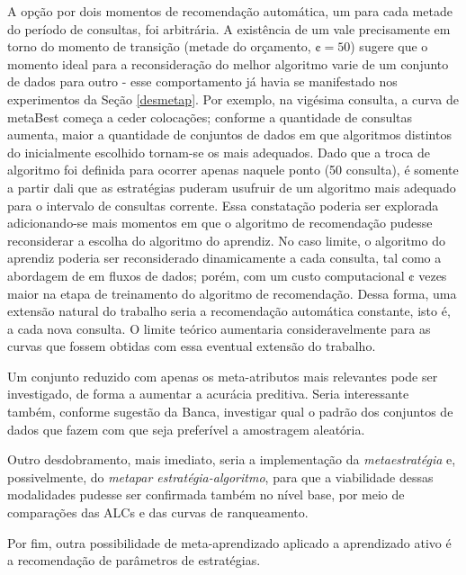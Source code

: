 A opção por dois momentos de recomendação automática, um para cada metade do período de consultas, foi arbitrária.
A existência de um vale precisamente em torno do momento de transição (metade do orçamento, $\cent=50$)
sugere que o momento ideal para a reconsideração do melhor algoritmo varie de um conjunto de dados para outro - esse comportamento já havia se manifestado nos experimentos da Seção \ref{desmetap}.
Por exemplo, na vigésima consulta, a curva de metaBest começa a ceder colocações; conforme a quantidade de consultas aumenta, maior a quantidade de conjuntos de dados em que algoritmos distintos do inicialmente escolhido tornam-se os mais adequados.
Dado que a troca de algoritmo foi definida para ocorrer apenas naquele ponto (50\textordfeminine\xspace consulta), é somente a partir dali que as estratégias puderam usufruir de um algoritmo mais adequado para o intervalo de consultas corrente.
Essa constatação poderia ser explorada adicionando-se mais momentos em que o algoritmo de recomendação pudesse reconsiderar a escolha do algoritmo do aprendiz.
No caso limite, o algoritmo do aprendiz poderia ser reconsiderado dinamicamente a cada consulta, tal como a abordagem de  em fluxos de dados; porém, com um custo computacional $\cent$ vezes maior na etapa de treinamento do algoritmo de recomendação.
Dessa forma, uma extensão natural do trabalho seria a recomendação automática constante, isto é, a cada nova consulta.
O limite teórico aumentaria consideravelmente para as curvas que fossem obtidas com essa eventual extensão do trabalho.

Um conjunto reduzido com apenas os meta-atributos mais relevantes pode ser investigado, de forma a aumentar a acurácia preditiva.
Seria interessante também, conforme sugestão da Banca, investigar qual o padrão dos conjuntos de dados que fazem com que seja preferível a amostragem aleatória.

Outro desdobramento, mais imediato, seria a implementação da \textit{metaestratégia} e, possivelmente, do \textit{metapar estratégia-algoritmo}, para que a viabilidade dessas modalidades pudesse ser confirmada também no nível base, por meio de comparações das ALCs e das curvas de ranqueamento.

Por fim, outra possibilidade de meta-aprendizado aplicado a aprendizado ativo é a recomendação de parâmetros de estratégias.



















